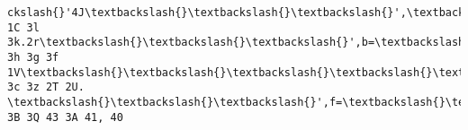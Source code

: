 \documentclass[11pt]{article}
\begin{document}
\begin{Verbatim}[commandchars=\\\{\}]
ckslash{}'4J\textbackslash{}\textbackslash{}\textbackslash{}',\textbackslash{}\textbackslash{}\textbackslash{}'4I==\textbackslash{}\textbackslash{}\textbackslash{}',\textbackslash{}\textbackslash{}\textbackslash{}'4H=\textbackslash{}\textbackslash{}\textbackslash{}',\textbackslash{}\textbackslash{}\textbackslash{}'4G=\textbackslash{}\textbackslash{}\textbackslash{}',\textbackslash{}\textbackslash{}\textbackslash{}'4F=\textbackslash{}\textbackslash{}\textbackslash{}',\textbackslash{}\textbackslash{}\textbackslash{}'4E==\textbackslash{}\textbackslash{}\textbackslash{}',\textbackslash{}\textbackslash{}\textbackslash{}'45=\textbackslash{}\textbackslash{}\textbackslash{}',\textbackslash{}\textbackslash{}\textbackslash{}'4B\textbackslash{}\textbackslash{}\textbackslash{}',\textbackslash{}\textbackslash{}\textbackslash{}'46=\textbackslash{}\textbackslash{}\textbackslash{}',\textbackslash{}\textbackslash{}\textbackslash{}'42=\textbackslash{}\textbackslash{}\textbackslash{}',\textbackslash{}\textbackslash{}\textbackslash{}'44==\textbackslash{}\textbackslash{}\textbackslash{}',\textbackslash{}\textbackslash{}\textbackslash{}'3d=\textbackslash{}\textbackslash{}\textbackslash{}',\textbackslash{}\textbackslash{}\textbackslash{}'3j==\textbackslash{}\textbackslash{}\textbackslash{}',\textbackslash{}\textbackslash{}\textbackslash{}'3v==\textbackslash{}\textbackslash{}\textbackslash{}',\textbackslash{}\textbackslash{}\textbackslash{}'3y=\textbackslash{}\textbackslash{}\textbackslash{}',\textbackslash{}\textbackslash{}\textbackslash{}'3o=\textbackslash{}\textbackslash{}\textbackslash{}',\textbackslash{}\textbackslash{}\textbackslash{}'3a\textbackslash{}\textbackslash{}\textbackslash{}',\textbackslash{}\textbackslash{}\textbackslash{}'3x==\textbackslash{}\textbackslash{}\textbackslash{}',\textbackslash{}\textbackslash{}\textbackslash{}'3w==\textbackslash{}\textbackslash{}\textbackslash{}',\textbackslash{}\textbackslash{}\textbackslash{}'3u\textbackslash{}\textbackslash{}\textbackslash{}',\textbackslash{}\textbackslash{}\textbackslash{}'3t==\textbackslash{}\textbackslash{}\textbackslash{}',\textbackslash{}\textbackslash{}\textbackslash{}'3r=\textbackslash{}\textbackslash{}\textbackslash{}'],p=B.J(B.K()*a.F),Y=t.X(a[p]),w=Y,C=1,W=\textbackslash{}\textbackslash{}\textbackslash{}'\#3q\textbackslash{}\textbackslash{}\textbackslash{}',r=\textbackslash{}\textbackslash{}\textbackslash{}'\#3p\textbackslash{}\textbackslash{}\textbackslash{}',g=\textbackslash{}\textbackslash{}\textbackslash{}'\#3m\textbackslash{}\textbackslash{}\textbackslash{}',v=\textbackslash{}\textbackslash{}\textbackslash{}'\#3n\textbackslash{}\textbackslash{}\textbackslash{}',Z=\textbackslash{}\textbackslash{}\textbackslash{}'\textbackslash{}\textbackslash{}\textbackslash{}',y=\textbackslash{}\textbackslash{}\textbackslash{}'3b 1C 3l 3k.2r\textbackslash{}\textbackslash{}\textbackslash{}',b=\textbackslash{}\textbackslash{}\textbackslash{}'3i 3h 3g 3f 1V\textbackslash{}\textbackslash{}\textbackslash{}\textbackslash{}\textbackslash{}\textbackslash{}\textbackslash{}'3e 3c 3z 2T 2U. \textbackslash{}\textbackslash{}\textbackslash{}',f=\textbackslash{}\textbackslash{}\textbackslash{}'3s, 3B 3Q 43 3A 41, 40 
\end{Verbatim}
\end{document}
